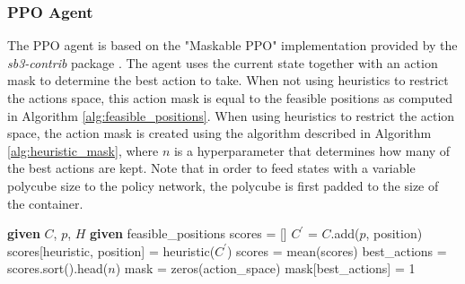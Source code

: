 \documentclass[conference]{IEEEtran}
\begin{document}
\subsubsection{PPO Agent} \label{sec:implementation:ppo}
The PPO agent is based on the "Maskable PPO" implementation provided by the \textit{sb3-contrib} package \cite{stable-baselines3}.
The agent uses the current state together with an action mask to determine the best action to take.
When not using heuristics to restrict the actions space, this action mask is equal to the feasible positions as computed in Algorithm \ref{alg:feasible_positions}.
When using heuristics to restrict the action space, the action mask is created using the algorithm described in Algorithm \ref{alg:heuristic_mask}, where $n$ is a hyperparameter that determines how many of the best actions are kept.
Note that in order to feed states with a variable polycube size to the policy network, the polycube is first padded to the size of the container.

\begin{algorithm}[!htb]
    \caption{Heuristic Action Mask}\label{alg:heuristic_mask}
    \begin{algorithmic}[1]
    \State \textbf{given} $C$, $p$, $H$ 
    \State \textbf{given} feasible\_positions
    \State scores = []
            \State $C^\prime$ = $C$.add($p$, position)
            \State scores[heuristic, position] = heuristic($C^\prime$)
        \EndFor
    \EndFor
    \State scores = mean(scores) 
    \State best\_actions = scores.sort().head($n$) 
    \State mask = zeros(action\_space)
    \State mask[best\_actions] = 1
    \end{algorithmic}
\end{algorithm}

%
%
\end{document}
